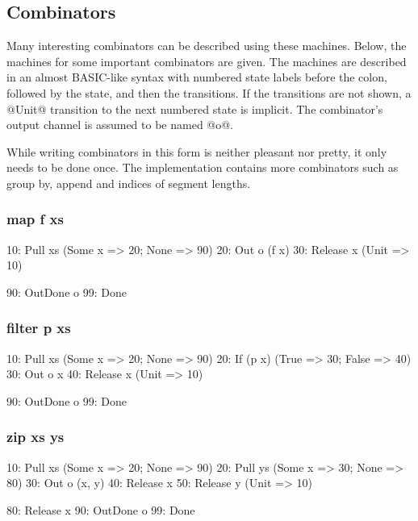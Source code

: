 \subsection{Combinators}
Many interesting combinators can be described using these machines.
Below, the machines for some important combinators are given.
The machines are described in an almost BASIC-like syntax with numbered state labels before the colon, followed by the state, and then the transitions.
If the transitions are not shown, a @Unit@ transition to the next numbered state is implicit.
The combinator's output channel is assumed to be named @o@.

While writing combinators in this form is neither pleasant nor pretty, it only needs to be done once.
The implementation contains more combinators such as group by, append and indices of segment lengths.

\subsubsection{map f xs}
\begin{code}
10: Pull xs         (Some x => 20; None  => 90)
20: Out o (f x)
30: Release x       (Unit   => 10)

90: OutDone o
99: Done
\end{code}

\subsubsection{filter p xs}
\begin{code}
10: Pull xs         (Some x => 20; None  => 90)
20: If (p x)        (True   => 30; False => 40)
30: Out o x
40: Release x       (Unit   => 10)

90: OutDone o
99: Done
\end{code}

\subsubsection{zip xs ys}
\begin{code}
10: Pull xs         (Some x => 20; None  => 90)
20: Pull ys         (Some x => 30; None  => 80)
30: Out o (x, y)
40: Release x
50: Release y       (Unit   => 10)

80: Release x
90: OutDone o
99: Done
\end{code}

